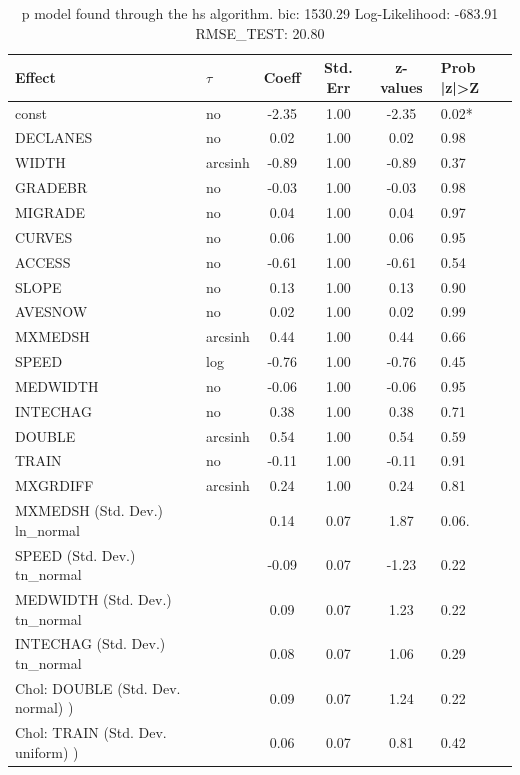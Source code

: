 \begin{table}
	\caption{p model found through the hs algorithm. bic: 1530.29 Log-Likelihood: -683.91 RMSE_TEST: 20.80}
	\begin{center}
		\begin{tabular}{|l|l|c|c|c|l|}
			\hline
			Effect & $\tau$ & Coeff & Std. Err & z-values & Prob |z|>Z \\
			\hline
			const & no & -2.35 & 1.00 & -2.35 & 0.02* \\
			\hline
			DECLANES & no & 0.02 & 1.00 & 0.02 & 0.98 \\
			\hline
			WIDTH & arcsinh & -0.89 & 1.00 & -0.89 & 0.37 \\
			\hline
			GRADEBR & no & -0.03 & 1.00 & -0.03 & 0.98 \\
			\hline
			MIGRADE & no & 0.04 & 1.00 & 0.04 & 0.97 \\
			\hline
			CURVES & no & 0.06 & 1.00 & 0.06 & 0.95 \\
			\hline
			ACCESS & no & -0.61 & 1.00 & -0.61 & 0.54 \\
			\hline
			SLOPE & no & 0.13 & 1.00 & 0.13 & 0.90 \\
			\hline
			AVESNOW & no & 0.02 & 1.00 & 0.02 & 0.99 \\
			\hline
			MXMEDSH & arcsinh & 0.44 & 1.00 & 0.44 & 0.66 \\
			\hline
			SPEED & log & -0.76 & 1.00 & -0.76 & 0.45 \\
			\hline
			MEDWIDTH & no & -0.06 & 1.00 & -0.06 & 0.95 \\
			\hline
			INTECHAG & no & 0.38 & 1.00 & 0.38 & 0.71 \\
			\hline
			DOUBLE & arcsinh & 0.54 & 1.00 & 0.54 & 0.59 \\
			\hline
			TRAIN & no & -0.11 & 1.00 & -0.11 & 0.91 \\
			\hline
			MXGRDIFF & arcsinh & 0.24 & 1.00 & 0.24 & 0.81 \\
			\hline
			MXMEDSH (Std. Dev.) ln_normal &  & 0.14 & 0.07 & 1.87 & 0.06. \\
			\hline
			SPEED (Std. Dev.) tn_normal &  & -0.09 & 0.07 & -1.23 & 0.22 \\
			\hline
			MEDWIDTH (Std. Dev.) tn_normal &  & 0.09 & 0.07 & 1.23 & 0.22 \\
			\hline
			INTECHAG (Std. Dev.) tn_normal &  & 0.08 & 0.07 & 1.06 & 0.29 \\
			\hline
			 Chol: DOUBLE (Std. Dev. normal) ) &  & 0.09 & 0.07 & 1.24 & 0.22 \\
			\hline
			 Chol: TRAIN (Std. Dev. uniform) ) &  & 0.06 & 0.07 & 0.81 & 0.42 \\

\end{tabular}
\end{center}
\end{table}
